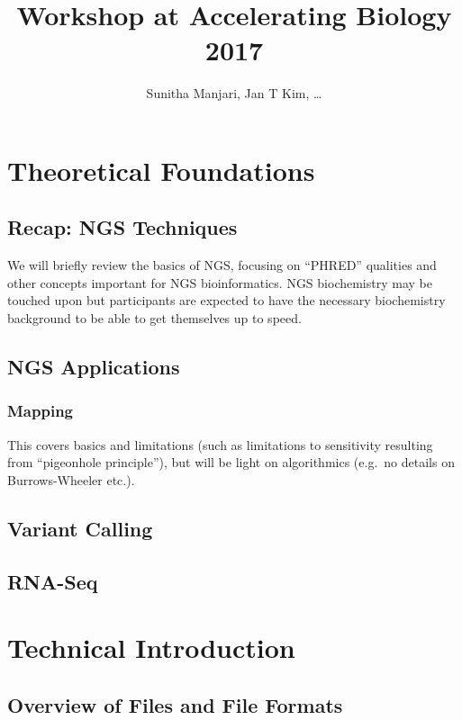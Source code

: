 \documentclass[a4paper,fleqn]{article}
\begin{document}
\title{Workshop at Accelerating Biology 2017}
\author{Sunitha Manjari, Jan T Kim, \ldots}
\date{}
\maketitle


\section{Theoretical Foundations}

\subsection{Recap: NGS Techniques}

We will briefly review the basics of NGS, focusing on ``PHRED''
qualities and other concepts important for NGS bioinformatics. NGS
biochemistry may be touched upon but participants are expected to have
the necessary biochemistry background to be able to get themselves up
to speed.


\subsection{NGS Applications}

\subsubsection{Mapping}

This covers basics and limitations (such as limitations to sensitivity
resulting from ``pigeonhole principle''), but will be light on
algorithmics (e.g.\ no details on Burrows-Wheeler etc.).


\subsection{Variant Calling}


\subsection{RNA-Seq}


\section{Technical Introduction}

\subsection{Overview of Files and File Formats}
\end{document}
